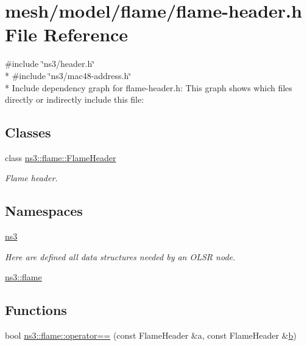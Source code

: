 \hypertarget{flame-header_8h}{}\section{mesh/model/flame/flame-\/header.h File Reference}
\label{flame-header_8h}
{\ttfamily \#include \char`\"{}ns3/header.\+h\char`\"{}}\\*
{\ttfamily \#include \char`\"{}ns3/mac48-\/address.\+h\char`\"{}}\\*
Include dependency graph for flame-\/header.h\+:
This graph shows which files directly or indirectly include this file\+:
\subsection*{Classes}
\begin{DoxyCompactItemize}
\item 
class \hyperlink{classns3_1_1flame_1_1FlameHeader}{ns3\+::flame\+::\+Flame\+Header}
\begin{DoxyCompactList}\small\item\em Flame header. \end{DoxyCompactList}\end{DoxyCompactItemize}
\subsection*{Namespaces}
\begin{DoxyCompactItemize}
\item 
 \hyperlink{namespacens3}{ns3}
\begin{DoxyCompactList}\small\item\em Here are defined all data structures needed by an O\+L\+SR node. \end{DoxyCompactList}\item 
 \hyperlink{namespacens3_1_1flame}{ns3\+::flame}
\end{DoxyCompactItemize}
\subsection*{Functions}
\begin{DoxyCompactItemize}
\item 
bool \hyperlink{namespacens3_1_1flame_a3b57e289b5f1e5ab8babfe2484ea5af8}{ns3\+::flame\+::operator==} (const Flame\+Header \&a, const Flame\+Header \&\hyperlink{lte__pathloss_8m_a21ad0bd836b90d08f4cf640b4c298e7c}{b})
\end{DoxyCompactItemize}
